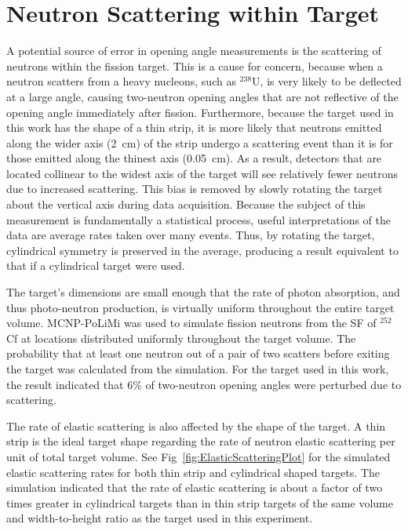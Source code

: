 \section{Neutron Scattering within Target}
\label{subsection:Elastic_scattering}
A potential source of error in opening angle measurements is the scattering of neutrons within the fission target.
This is a cause for concern, because when a neutron scatters from a heavy nucleons, such as $^{238}$U, is very likely to be deflected at a large angle, causing two-neutron opening angles that are not reflective of the opening angle immediately after fission.
Furthermore, because the target used in this work has the shape of a thin strip, it is more likely that neutrons emitted along the wider axis (2~cm) of the strip undergo a scattering event than it is for those emitted along the thinest axis (0.05~cm).
As a result, detectors that are located collinear to the widest axis of the target will see relatively fewer neutrons due to increased scattering. 
This bias is removed by slowly rotating the target about the vertical axis during data acquisition.
Because the subject of this measurement is fundamentally a statistical process, useful interpretations of the data are average rates taken over many events.
Thus, by rotating the target, cylindrical symmetry is preserved in the average, producing a result equivalent to that if a cylindrical target were used.

The target's dimensions are small enough that the rate of photon absorption, and thus photo-neutron production, is virtually uniform throughout the entire target volume.
MCNP-PoLiMi was used to simulate fission neutrons from the SF of $^{252}$Cf at locations distributed uniformly throughout the target volume.
The probability that at least one neutron out of a pair of two scatters before exiting the target was calculated from the simulation.
For the target used in this work, the result indicated that 6\% of two-neutron opening angles were perturbed due to scattering.

The rate of elastic scattering is also affected by the shape of the target.
A thin strip is the ideal target shape regarding the rate of neutron elastic scattering per unit of total target volume.
See Fig~\ref{fig:ElasticScatteringPlot} for the simulated elastic scattering rates for both thin strip and cylindrical shaped targets.
The simulation indicated that the rate of elastic scattering is about a factor of two times greater in cylindrical targets than in thin strip targets of the same volume and width-to-height ratio as the target used in this experiment.

